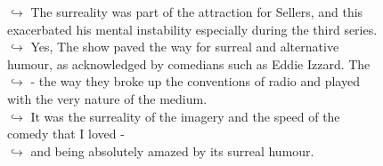 \documentclass[11pt,a4paper, onecolumn]{article}
\begin{document}
\begin{figure}[t] \small \begin{tcolorbox}[boxsep=0pt,left=5pt,right=0pt,top=2pt,colback = yellow!5] \begin{dialogue}
 \small 
\colorbox{pink!25}{$\hookrightarrow$}
{ The surreality was part of the attraction for Sellers, and this exacerbated his mental instability especially during the third series. }
\\
\colorbox{pink!25}{$\hookrightarrow$}
\colorbox{red!25}{Yes,}
{ The show paved the way for surreal and alternative humour, as acknowledged by comedians such as Eddie Izzard. The }
\\
\colorbox{pink!25}{$\hookrightarrow$}
{ - the way they broke up the conventions of radio and played with the very nature of the medium. }
\\
\colorbox{pink!25}{$\hookrightarrow$}
{ It was the surreality of the imagery and the speed of the comedy that I loved - }
\\
\colorbox{pink!25}{$\hookrightarrow$}
{ and being absolutely amazed by its surreal humour. }
\\
 \end{dialogue}\end{tcolorbox}\end{figure}
\end{document}
